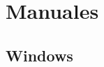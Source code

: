 {
  \linespread{1}
  \cleardoublepage  
  \appendix
  \chapter{Manuales}
  \label{apdx:a}
}



    \section {Windows}

%

